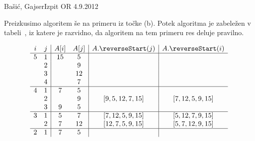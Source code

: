 \begin{naloga}{Bašić, Gajser}{Izpit OR 4.9.2012}
\begin{odgovor}
\begin{enumerate}[(a)]
Preizkusimo algoritem še na primeru iz točke (b).
Potek algoritma je zabeležen v tabeli~,
iz katere je razvidno, da algoritem na tem primeru res deluje pravilno.
\end{enumerate}
%
\begin{tabela}
$$
\begin{array}{cc|cc|c|c}
i & j & A[i] & A[j] & A.\reverseStart(j) & A.\reverseStart(i) \\ \hline
5 & 1 & 15 &  5 && \\
  & 2 &    &  9 && \\
  & 3 &    & 12 && \\
  & 4 &    &  7 && \\ \hline
4 & 1 &  7 &  5 && \\
  & 2 &    &  9 & [9, 5, 12, 7, 15] & [7, 12, 5, 9, 15] \\
  & 3 &  9 &  5 && \\ \hline
3 & 1 &  5 &  7 & [7, 12, 5, 9, 15] & [5, 12, 7, 9, 15] \\
  & 2 &  7 & 12 & [12, 7, 5, 9, 15] & [5, 7, 12, 9, 15] \\ \hline
2 & 1 &  7 &  5 &&
\end{array}
$$
\end{tabela}
%
\begin{tabela}
\end{tabela}
\end{odgovor}
\end{naloga}
